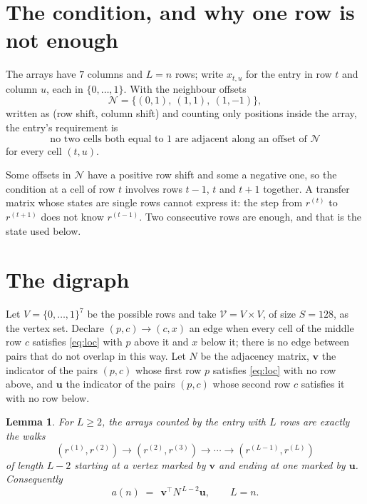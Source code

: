 \documentclass[11pt,a4paper]{article}
\theoremstyle{plain}
\newtheorem{lemma}[theorem]{Lemma}
\theoremstyle{definition}
\begin{document}
\section{The condition, and why one row is not enough}

The arrays have $7$ columns and $L=n$ rows; write $x_{t,u}$ for the entry in
row $t$ and column $u$, each in $\{0,\dots,1\}$. With the neighbour offsets
\[
\mathcal N=\{(0,1),\ (1,1),\ (1,-1)\},
\]
written as (row shift, column shift) and counting only positions inside the array, the
entry's requirement is
\begin{equation}\label{eq:loc}
\text{no two cells both equal to }1\text{ are adjacent along an offset of }\mathcal N
\end{equation}
for every cell $(t,u)$.

Some offsets in $\mathcal N$ have a positive row shift and some a negative one, so the
condition at a cell of row $t$ involves rows $t-1$, $t$ and $t+1$ together. A transfer
matrix whose states are single rows cannot express it: the step from $r^{(t)}$ to
$r^{(t+1)}$ does not know $r^{(t-1)}$. Two consecutive rows are enough, and that is
the state used below.

\section{The digraph}

Let $V=\{0,\dots,1\}^{7}$ be the possible rows and take
$\mathcal V=V\times V$, of size $S=128$, as the vertex set. Declare $(p,c)\to(c,x)$ an edge
when every cell of the middle row $c$ satisfies \eqref{eq:loc} with $p$ above it and $x$
below it; there is no edge between pairs that do not overlap in this way. Let $N$ be the
adjacency matrix, $\mathbf{v}$ the indicator of the pairs $(p,c)$ whose first row $p$
satisfies \eqref{eq:loc} with no row above, and $\mathbf{u}$ the indicator of
the pairs $(p,c)$ whose second row $c$ satisfies it with no row below.

\begin{lemma}\label{lem:walk}
For $L\ge2$, the arrays counted by the entry with $L$ rows are exactly the walks
\[
(r^{(1)},r^{(2)})\to(r^{(2)},r^{(3)})\to\cdots\to(r^{(L-1)},r^{(L)})
\]
of length $L-2$ starting at a vertex marked by $\mathbf{v}$ and ending at one marked by
$\mathbf{u}$. Consequently
\[
a(n)\;=\;\,\mathbf{v}^{\!\top}N^{\,L-2}\mathbf{u},\qquad L=n .
\]
\end{lemma}
\end{document}
